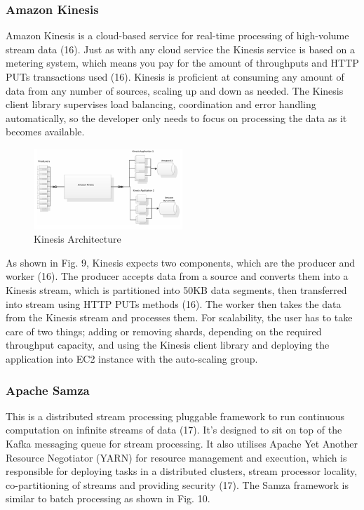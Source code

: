 \subsubsection{Amazon Kinesis} \label{subsubsec-lr-reallayer-kinesis}
Amazon Kinesis is a cloud-based service for real-time processing of high-volume stream data (16). Just as with any cloud service the Kinesis service is based on a metering system, which means you pay for the amount of throughputs and HTTP PUTs transactions used (16). Kinesis is proficient at consuming any amount of data from any number of sources, scaling up and down as needed. The Kinesis client library supervises load balancing, coordination and error handling automatically, so the developer only needs to focus on processing the data as it becomes available.

\begin{figure}[H]
\centering
\includegraphics[width=0.5\textwidth]{Figures/kinesis.png}
\caption{Kinesis Architecture}\label{fig-real-kinesis}
\end{figure}

As shown in Fig. 9, Kinesis expects two components, which are the producer and worker (16). The producer accepts data from a source and converts them into a Kinesis stream, which is partitioned into 50KB data segments, then transferred into stream using HTTP PUTs methods (16). The worker then takes the data from the Kinesis stream and processes them. For scalability, the user has to take care of two things; adding or removing shards, depending on the required throughput capacity, and using the Kinesis client library and deploying the application into EC2 instance with the auto-scaling group.

\subsubsection{Apache Samza} \label{subsubsec-lr-reallayer-samza}
This is a distributed stream processing pluggable framework to run continuous computation on infinite streams of data (17). It’s designed to sit on top of the Kafka messaging queue for stream processing. It also utilises Apache Yet Another Resource Negotiator (YARN) for resource management and execution, which is responsible for deploying tasks in a distributed clusters, stream processor locality, co-partitioning of streams and providing security (17). The Samza framework is similar to batch processing as shown in Fig. 10.

